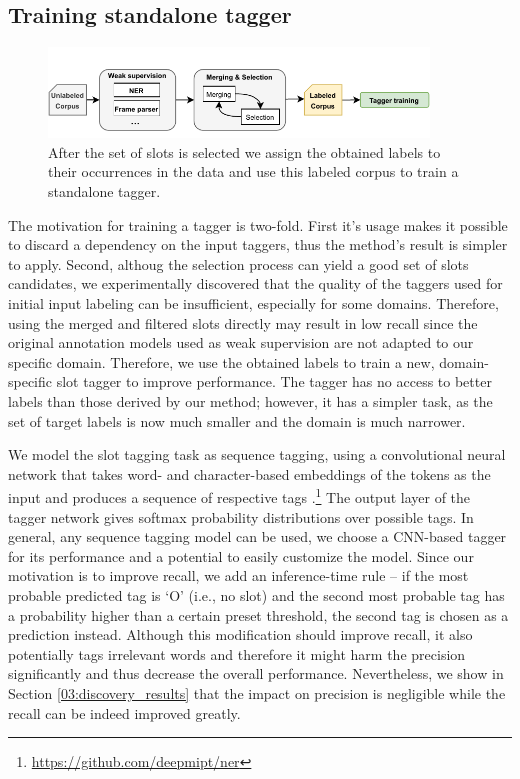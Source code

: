 \subsection{Training standalone tagger}
\label{04:training_tagger}
\begin{figure}[h]
    \centering
    \includegraphics[width=0.9\textwidth]{images/tagging.pdf}
    \caption{After the set of slots is selected we assign the obtained labels to their occurrences in the data and use this labeled corpus to train a standalone tagger. }
    \label{fig:training_tagger}
\end{figure}
The motivation for training a tagger is two-fold.
First it's usage makes it possible to discard a dependency on the input taggers, thus the method's result is simpler to apply. 
Second, althoug the selection process can yield a good set of slots candidates, we experimentally discovered that the quality of the taggers used for initial input labeling can be insufficient, especially for some domains.
Therefore, using the merged and filtered slots directly may result in low recall since the original annotation models used as weak supervision are not adapted to our specific domain.
Therefore, we use the obtained labels to train a new, domain-specific slot tagger to improve performance.
The tagger has no access to better labels than those derived by our method; however, it has a simpler task, as the set of target labels is now much smaller and the domain is much narrower.

We model the slot tagging task as sequence tagging, using a convolutional neural network that takes word- and character-based embeddings of the tokens as the input and produces a sequence of respective tags \cite{lample2016neural}.\footnote{\url{https://github.com/deepmipt/ner}}
The output layer of the tagger network gives softmax probability distributions over possible tags.
In general, any sequence tagging model can be used, we choose a CNN-based tagger for its performance and a potential to easily customize the model.
Since our motivation is to improve recall, we add an inference-time rule -- if the most probable predicted tag is `O' (i.e., no slot) and the second most probable tag has a probability higher than a certain preset threshold, the second tag is chosen as a prediction instead.
Although this modification should improve recall, it also potentially tags irrelevant words and therefore it might harm the precision significantly and thus decrease the overall performance.
Nevertheless, we show in Section \ref{03:discovery_results} that the impact on precision is negligible while the recall can be indeed improved greatly. 

